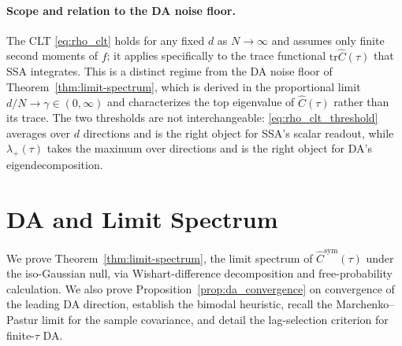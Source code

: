 \documentclass{article}
\newcommand{\tr}{\mathrm{tr}}
\begin{document}
\paragraph{Scope and relation to the DA noise floor.}
The CLT \eqref{eq:rho_clt} holds for any fixed $d$ as $N \to \infty$
and assumes only finite second moments of $f$; it applies specifically to
the trace functional $\tr \hat C(\tau)$ that SSA integrates. This is a
distinct regime from the DA noise floor of
Theorem~\ref{thm:limit-spectrum}, which is derived in the proportional
limit $d/N \to \gamma \in (0, \infty)$ and characterizes the top eigenvalue of
$\hat C(\tau)$ rather than its trace. The two thresholds are not
interchangeable: \eqref{eq:rho_clt_threshold} averages over $d$
directions and is the right object for SSA's scalar readout, while
$\lambda_+(\tau)$ takes the maximum over directions and is the right
object for DA's eigendecomposition.


\section{DA and Limit Spectrum}
\label{app:da_limit_spectrum}

We prove Theorem~\ref{thm:limit-spectrum}, the limit spectrum of $\hat C^{\mathrm{sym}}(\tau)$ under the iso-Gaussian null, via Wishart-difference decomposition and free-probability calculation. We also prove Proposition~\ref{prop:da_convergence} on convergence of the leading DA direction, establish the bimodal heuristic, recall the Marchenko--Pastur limit for the sample covariance, and detail the lag-selection criterion for finite-$\tau$ DA.
\end{document}
